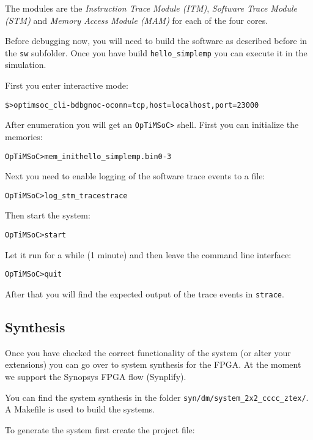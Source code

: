 The modules are the \emph{Instruction Trace Module (ITM)},
\emph{Software Trace Module (STM)} and \emph{Memory Access Module
  (MAM)} for each of the four cores.

Before debugging now, you will need to build the software as described
before in the \verb|sw| subfolder. Once you have build
\verb|hello_simplemp| you can execute it in the simulation.

First you enter interactive mode:

\begin{alltt}
\$> optimsoc_cli -bdbgnoc -oconn=tcp,host=localhost,port=23000
\end{alltt}

After enumeration you will get an \verb|OpTiMSoC>| shell. First you
can initialize the memories:

\begin{alltt}
OpTiMSoC> mem_init hello_simplemp.bin 0-3
\end{alltt}

Next you need to enable logging of the software trace events to a
file:

\begin{alltt}
OpTiMSoC> log_stm_trace strace
\end{alltt}

Then start the system:
\begin{alltt}
OpTiMSoC> start
\end{alltt}

Let it run for a while (1 minute) and then leave the command line
interface:
\begin{alltt}
OpTiMSoC> quit
\end{alltt}

After that you will find the expected output of the trace events in
\verb|strace|.

\subsection{Synthesis}

Once you have checked the correct functionality of the system (or
alter your extensions) you can go over to system synthesis for the
FPGA. At the moment we support the Synopsys FPGA flow (Synplify).

You can find the system synthesis in the folder
\verb|syn/dm/system_2x2_cccc_ztex/|. A Makefile is used to build the
systems.

To generate the system first create the project file:

